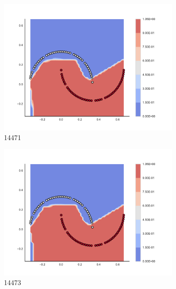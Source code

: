 \begin{figure}[h]
\begin{subfigure}[b]{0.09\textwidth}
    \includegraphics[clip, trim=2.35cm 1.75cm 4.5cm 0cm,width=\textwidth]{img/convergence/14471.pdf}
    \caption{14471}
    \label{fig:convergence_14471}
\end{subfigure}
%
\begin{subfigure}[b]{0.09\textwidth}
    \includegraphics[clip, trim=2.35cm 1.75cm 4.5cm 0cm,width=\textwidth]{img/convergence/14473.pdf}
    \caption{14473}
    \label{fig:convergence_14473}
\end{subfigure}
%
\begin{subfigure}[b]{0.09\textwidth}

\end{subfigure}
\end{figure}
